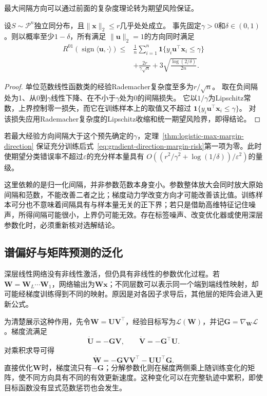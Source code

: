 最大间隔方向可以通过前面的复杂度理论转为期望风险保证。
\begin{theorem}[基于最大间隔的分类期望风险]
\label{thm:max-margin-classification-risk}
设$S\sim\mathcal P^n$独立同分布，且$\|\bm x\|_2\leq r$几乎处处成立。
事先固定$\gamma>0$和$\delta\in(0,1)$。则以概率至少$1-\delta$，所有满足
$\|\bm u\|_2=1$的方向同时满足
\begin{equation}
 \begin{aligned}
 R^{01}(\operatorname{sign}\langle\bm u,\cdot\rangle)
 \leq{}&\frac1n\sum_{i=1}^n
       \mathbf1\{y_i\bm u^\top\bm x_i\leq\gamma\}\\
 &+\frac{2r}{\gamma\sqrt n}
       +3\sqrt{\frac{\log(2/\delta)}{2n}}.
 \end{aligned}
 \label{eq:gradient-direction-margin-risk}
\end{equation}
\end{theorem}
\begin{proof}
单位范数线性函数类的经验Rademacher复杂度至多为$r/\sqrt n$。
取在负间隔处为1、从0到$\gamma$线性下降、在不小于$\gamma$处为0的间隔损失。
它以$1/\gamma$为Lipschitz常数，上界控制零一损失，而它在训练样本上的取值又不超过
$\mathbf1\{y_i\bm u^\top\bm x_i\leq\gamma\}$。
对该损失应用Rademacher复杂度的Lipschitz收缩和统一期望风险界，即得结论。
\end{proof}

若最大经验方向间隔大于这个预先确定的$\gamma$，定理~\ref{thm:logistic-max-margin-direction}
保证充分训练后式~\eqref{eq:gradient-direction-margin-risk}第一项为零。此时使期望分类错误率不超过$\varepsilon$的充分样本量具有
$O((r^2/\gamma^2+\log(1/\delta))/\varepsilon^2)$的量级。

这里依赖的是归一化间隔，并非参数范数本身变小。参数整体放大会同时放大原始间隔和范数，不能改善二者之比；梯度动力学改变方向才可能改善该比值。训练样本可分也不意味着间隔具有与样本量无关的正下界；若只是借助高维特征记住噪声，所得间隔可能很小，上界仍可能无效。存在标签噪声、改变优化器或使用深层参数化时，必须重新核对选解结论。

\subsection{谱偏好与矩阵预测的泛化}

深层线性网络没有非线性激活，但仍具有非线性的参数优化过程。若
$\bm W=\bm W_L\cdots\bm W_1$，网络输出为$\bm W\bm x$；不同层数可以表示同一个端到端线性映射，却可能经梯度训练得到不同的映射。原因是对各因子求导后，其他层的矩阵会进入更新公式。

为清楚展示这种作用，先令$\bm W=\bm U\bm V^\top$，经验目标写为$\mathcal L(\bm W)$，并记$\bm G=\nabla_{\bm W}\mathcal L$。梯度流满足
\[
 \dot{\bm U}=-\bm G\bm V,\qquad
 \dot{\bm V}=-\bm G^\top\bm U.
\]
对乘积求导可得
\begin{equation}
 \dot{\bm W}=-\bm G\bm V\bm V^\top-\bm U\bm U^\top\bm G.
 \label{eq:factorized-gradient-flow}
\end{equation}
直接优化$\bm W$时，梯度流只有$-\bm G$；分解参数化则在梯度两侧乘上随训练变化的矩阵，使不同方向具有不同的有效更新速度。这种变化可以在完整轨迹中累积，即使目标函数没有显式范数惩罚也会发生。

